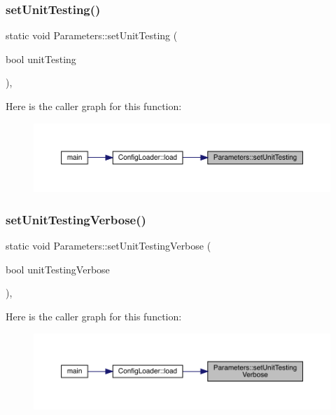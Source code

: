 \subsubsection{\texorpdfstring{setUnitTesting()}{setUnitTesting()}}
{\footnotesize\ttfamily static void Parameters\+::set\+Unit\+Testing (\begin{DoxyParamCaption}\item[{bool}]{unit\+Testing }\end{DoxyParamCaption})\hspace{0.3cm}{\ttfamily [inline]}, {\ttfamily [static]}}

Here is the caller graph for this function\+:
\nopagebreak
\begin{figure}[H]
\begin{center}
\leavevmode
\includegraphics[width=350pt]{class_parameters_a2d7077c967fffbdc6652559ec261b67c_icgraph}
\end{center}
\end{figure}
\mbox{\label{class_parameters_a2cf1ae12581e8f80dd88ce6c60f37c5f}} 
\subsubsection{\texorpdfstring{setUnitTestingVerbose()}{setUnitTestingVerbose()}}
{\footnotesize\ttfamily static void Parameters\+::set\+Unit\+Testing\+Verbose (\begin{DoxyParamCaption}\item[{bool}]{unit\+Testing\+Verbose }\end{DoxyParamCaption})\hspace{0.3cm}{\ttfamily [inline]}, {\ttfamily [static]}}

Here is the caller graph for this function\+:
\nopagebreak
\begin{figure}[H]
\begin{center}
\leavevmode
\includegraphics[width=350pt]{class_parameters_a2cf1ae12581e8f80dd88ce6c60f37c5f_icgraph}
\end{center}
\end{figure}
\mbox{\label{class_parameters_aa0ac9d09db506844758e0a5d23dedeb4}} 
